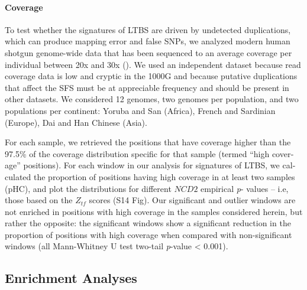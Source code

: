 \begin{refsection}
\begin{otherlanguage}{english}
\paragraph{Coverage}

To test whether the signatures of LTBS are driven by undetected duplications, which can produce mapping error and false SNPs, we analyzed modern human shotgun genome-wide data that has been sequenced to an average coverage per individual between 20x and 30x (\cite{Meyer2012,Prufer2013}). We used an independent dataset because read coverage data is low and cryptic in the 1000G and because putative duplications that affect the SFS must be at appreciable frequency and should be present in other datasets. We considered 12 genomes, two genomes per population, and two populations per continent: Yoruba and San (Africa), French and Sardinian (Europe), Dai and Han Chinese (Asia).

For each sample, we retrieved the positions that have coverage higher than the 97.5\% of the coverage distribution specific for that sample (termed “high coverage” positions). For each window in our analysis for signatures of LTBS, we calculated the proportion of positions having high coverage in at least two samples (pHC), and plot the distributions for different $NCD2$ empirical \emph{p}- values -- i.e, those based on the $Z_{tf}$ scores (S14 Fig). Our significant and outlier windows are not enriched in positions with high coverage in the samples considered herein, but rather the opposite: the significant windows show a significant reduction in the proportion of positions with high coverage when compared with non-significant windows (all Mann-Whitney U test two-tail \emph{p}-value < 0.001).



\subsection{Enrichment Analyses} %

\end{otherlanguage}
\end{refsection}
